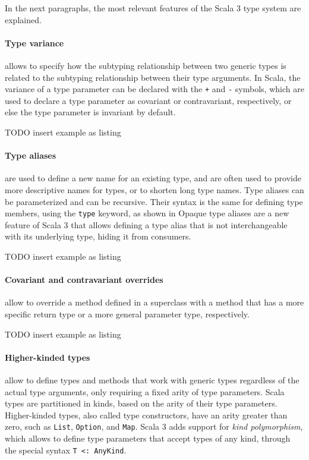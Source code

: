 In the next paragraphs, the most relevant features of the Scala 3 type system are explained.

\paragraph{Type variance} allows to specify how the subtyping relationship between two generic types is related to the subtyping relationship between their type arguments.
%
In Scala, the variance of a type parameter can be declared with the \texttt{+} and \texttt{-} symbols, which are used to declare a type parameter as covariant or contravariant, respectively, or else the type parameter is invariant by default.

TODO insert example as listing

\paragraph{Type aliases} are used to define a new name for an existing type, and are often used to provide more descriptive names for types, or to shorten long type names.
%
Type aliases can be parameterized and can be recursive.
%
Their syntax is the same for defining type members, using the \texttt{type} keyword, as shown in
%
Opaque type aliases are a new feature of Scala 3 that allows defining a type alias that is not interchangeable with its underlying type, hiding it from consumers.

TODO insert example as listing

\paragraph{Covariant and contravariant overrides} allow to override a method defined in a superclass with a method that has a more specific return type or a more general parameter type, respectively.

TODO insert example as listing

\paragraph{Higher-kinded types} allow to define types and methods that work with generic types regardless of the actual type arguments, only requiring a fixed arity of type parameters.
%
Scala types are partitioned in kinds, based on the arity of their type parameters.
%
Higher-kinded types, also called type constructors, have an arity greater than zero, such as \texttt{List}, \texttt{Option}, and \texttt{Map}.
%
Scala 3 adds support for \textit{kind polymorphism}, which allows to define type parameters that accept types of any kind, through the special syntax \texttt{T <: AnyKind}.

